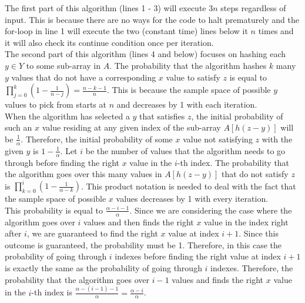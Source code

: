 The first part of this algorithm (lines 1 - 3) will execute $3n$ steps regardless of input. This is because there are no ways for the code to halt prematurely and the for-loop in line 1 will execute the two (constant time) lines below it $n$ times and it will also check its continue condition once per iteration. \\

The second part of this algorithm (lines 4 and below) focuses on hashing each $y\in Y$ to some sub-array in $A$. The probability that the algorithm hashes $k$ many $y$ values that do not have a corresponding $x$ value to satisfy $z$ is 
equal to $\prod\limits_{j=0}^k(1-\frac{1}{n-j}) = \frac{n - k - 1}{n}$. This is because the sample space of possible $y$ values to pick from starts at $n$ and decreases by 1 with each iteration. \\

When the algorithm has selected a $y$ that satisfies $z$, the initial probability of such an $x$ value residing at any given index of the sub-array $A[h(z - y)]$ will be $\frac{1}{\alpha}$. Therefore, the initial probability of some $x$ value  not satisfying $z$ with the given $y$ is $1 - \frac{1}{\alpha}$. Let $i$ be the number of values that the algorithm needs to go through before finding the right $x$ value in the $i$-th index. The probability that the algorithm goes over this many values in $A[h(z - y)]$ that do not satisfy $z$ is $\prod\limits_{k=0}^i(1 - \frac{1}{\alpha - k})$. This product notation is needed to deal with the fact that the sample space of possible $x$ values decreases by 1 with every iteration. \\

This probability is equal to $\frac{\alpha - i - 1}{\alpha}$. Since we are considering the case where the algorithm goes over $i$ values and then finds the right $x$ value in the index right after $i$, we are guaranteed to find the right $x$ value at index $i+1$. Since this outcome is guaranteed, the probability must be 1. Therefore, in this case the probability of going through $i$ indexes before finding the right value at index $i+1$ is exactly the same as the probability of going through $i$ indexes. Therefore, the probability that the algorithm goes over $i-1$ values and finds the right $x$ value in the $i$-th index is $\frac{\alpha - (i - 1) - 1}{\alpha} = \frac{\alpha - i}{\alpha}$. \\

